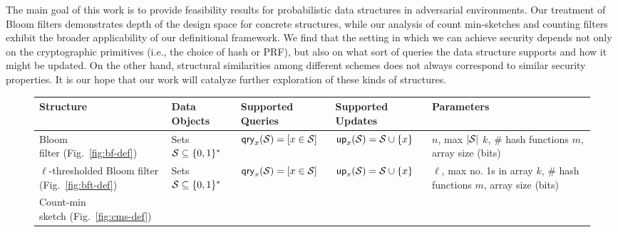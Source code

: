 %
The main goal of this work is to provide feasibility results for probabilistic
data structures in adversarial environments. Our treatment of Bloom filters
demonstrates depth of the design space for concrete structures, while our
analysis of count min-sketches and counting filters exhibit the broader
applicability of our definitional framework.
%
We find that the setting in which we can achieve security depends not only on
the cryptographic primitives (i.e., the choice of hash or PRF), but also on what
sort of queries the data structure supports and how it might be updated. On the
other hand, structural similarities among different schemes does not always
correspond to similar security properties.
%
It is our hope that our work will catalyze further exploration of these kinds of
structures.

\begin{figure*}[tp]
\begin{center}
\small
  \begin{tabular}{ |p{1.75cm} | p{2.5cm} | p{2.95cm} | p{4cm} | p{3.7cm}|}
    \hline
    {\bf Structure} & {\bf Data Objects} & {\bf Supported Queries} & {\bf Supported Updates} & {\bf Parameters} \\ \hline
    \parbox[c]{1.5cm}{Bloom\\ filter (Fig.~\ref{fig:bf-def})}
          & \parbox[c][6ex]{2cm}{Sets\\$\mathcal{S}\subseteq \{0,1\}^*$} %
          & $\mathsf{qry}_x(\mathcal{S}) = [x \in \mathcal{S}]$
          &  $\mathsf{up}_x(\mathcal{S}) = \mathcal{S} \cup \{x\}$
          & \parbox[c]{4cm}{$n$, max $|\mathcal{S}|$\\$k$, \# hash functions\\$m$, array size (bits)}
          \\\hline
     \parbox[c]{2cm}{$\ell$-thresholded\\ Bloom filter\\ (Fig.~\ref{fig:bft-def})}
          & \parbox[c]{2.5cm}{Sets\\ $\mathcal{S} \subseteq \{0,1\}^*$}
          & $\mathsf{qry}_x(\mathcal{S}) = [x \in \mathcal{S}]$
          & \parbox[c][10ex]{4cm}{$\mathsf{up}_x(\mathcal{S}) = \mathcal{S} \cup \{x\}$}
          & \parbox[c]{3.75cm}{$\ell$, max no. 1s in array\\$k$, \# hash functions\\$m$, array size (bits)}
          \\ \hline
     \parbox[c]{2cm}{Count-min\\ sketch (Fig.~\ref{fig:cms-def})}

\end{tabular}
\end{center}
\end{figure*}

